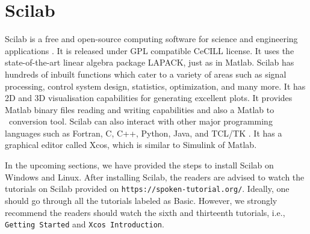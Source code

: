 
\section{Scilab}
\label{sec:sci-start}
Scilab is a free and open-source computing software for science and
engineering applications \cite{scilab-ref}. It is released under GPL
compatible CeCILL license.  It uses the state-of-the-art linear
algebra package LAPACK, just as in Matlab.  Scilab has hundreds of
inbuilt functions which cater to a variety of areas such as signal
processing, control system design, statistics, optimization, and many
more. It has 2D and 3D visualisation capabilities for generating
excellent plots. It provides Matlab binary files reading and writing
capabilities and also a Matlab to \scilab\ conversion tool. Scilab can
also interact with other major programming languages such as Fortran,
C, C++, Python, Java, and TCL/TK \cite{scilab-interop}.  It has a
graphical editor called Xcos, which is similar to Simulink of Matlab. 

In the upcoming sections, we have provided the steps to install Scilab on 
Windows and Linux. After installing Scilab, the readers are advised to 
watch the tutorials on Scilab provided on {\tt https://spoken-tutorial.org/}. 
Ideally, one should go through all the tutorials labeled as Basic. 
However, we strongly recommend the readers should watch the sixth and 
thirteenth tutorials, i.e., {\tt Getting Started} and {\tt Xcos Introduction}. 


